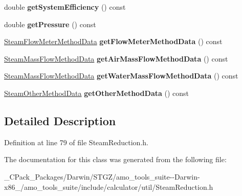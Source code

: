 \begin{DoxyCompactItemize}
double {\bfseries get\+System\+Efficiency} () const
\item 
\mbox{\label{class_steam_reduction_input_ab02ca5d6f81ba93c8b0e6b9ad134dbca}} 
double {\bfseries get\+Pressure} () const
\item 
\mbox{\label{class_steam_reduction_input_ac830ce35244e62bdf57a2179ad8ef6c6}} 
\hyperlink{class_steam_flow_meter_method_data}{Steam\+Flow\+Meter\+Method\+Data} {\bfseries get\+Flow\+Meter\+Method\+Data} () const
\item 
\mbox{\label{class_steam_reduction_input_afb59841b5666f33eae95ccea483aea1d}} 
\hyperlink{class_steam_mass_flow_method_data}{Steam\+Mass\+Flow\+Method\+Data} {\bfseries get\+Air\+Mass\+Flow\+Method\+Data} () const
\item 
\mbox{\label{class_steam_reduction_input_a81d1df7d17bcac53c277d371fd0396e1}} 
\hyperlink{class_steam_mass_flow_method_data}{Steam\+Mass\+Flow\+Method\+Data} {\bfseries get\+Water\+Mass\+Flow\+Method\+Data} () const
\item 
\mbox{\label{class_steam_reduction_input_a0975aab8faf50599028f150c184c9699}} 
\hyperlink{class_steam_other_method_data}{Steam\+Other\+Method\+Data} {\bfseries get\+Other\+Method\+Data} () const
\end{DoxyCompactItemize}


\subsection{Detailed Description}


Definition at line 79 of file Steam\+Reduction.\+h.



The documentation for this class was generated from the following file\+:\begin{DoxyCompactItemize}
\item 
\+\_\+\+C\+Pack\+\_\+\+Packages/\+Darwin/\+S\+T\+G\+Z/amo\+\_\+tools\+\_\+suite-\/-\/\+Darwin-\/x86\+\_/amo\+\_\+tools\+\_\+suite/include/calculator/util/Steam\+Reduction.\+h\end{DoxyCompactItemize}
